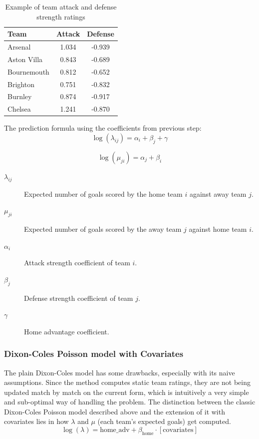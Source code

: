 \documentclass{article}
\begin{document}
\begin{table}[H]
\centering
\begin{tabular}{@{} l c c @{}}
\toprule
\textbf{Team} & \textbf{Attack} & \textbf{Defense} \\
\midrule
Arsenal      & 1.034 & -0.939 \\
Aston Villa  & 0.843 & -0.689 \\
Bournemouth  & 0.812 & -0.652 \\
Brighton     & 0.751 & -0.832 \\
Burnley      & 0.874 & -0.917 \\
Chelsea      & 1.241 & -0.870 \\
\bottomrule
\end{tabular}
\caption{Example of team attack and defense strength ratings}
\label{tab:team_ratings}
\end{table}

The prediction formula using the coefficients from previous step:
\begin{equation}
\log(\lambda_{ij}) = \alpha_i + \beta_j + \gamma
\end{equation}

\begin{equation}
\log(\mu_{ji}) = \alpha_j + \beta_i
\end{equation}

\begin{description}
    \item[$\lambda_{ij}$] Expected number of goals scored by the home team $i$ against away team $j$.
    \item[$\mu_{ji}$] Expected number of goals scored by the away team $j$ against home team $i$.
    \item[$\alpha_i$] Attack strength coefficient of team $i$.
    \item[$\beta_j$] Defense strength coefficient of team $j$.
    \item[$\gamma$] Home advantage coefficient.
\end{description}


\subsubsection{Dixon-Coles Poisson model with Covariates}
The plain Dixon-Coles model has some drawbacks, especially with its naive assumptions. Since the method computes static team ratings, they are not being updated match by match on the current form, which is intuitively a very simple and sub-optimal way of handling the problem. The distinction between the classic Dixon-Coles Poisson model described above and the extension of it with covariates lies in how $\lambda$ and $\mu$ (each team's expected goals) get computed. 
\begin{equation}
\log(\lambda) = \text{home\_adv} + \beta_{\text{home}} \cdot [\text{covariates}]
\end{equation}
\end{document}
